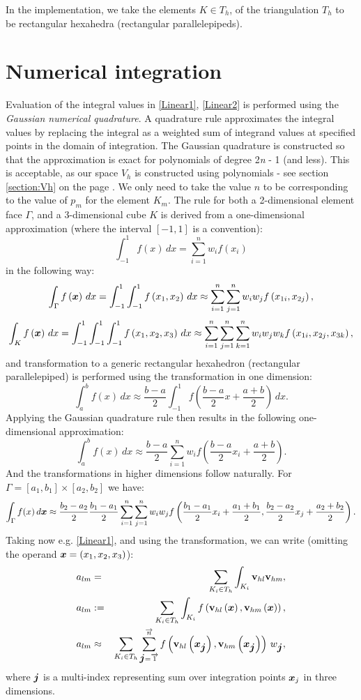 In the implementation, we take the elements $K \in T_h$, of the triangulation $T_h$ to be rectangular hexahedra (rectangular parallelepipeds).
\section{Numerical integration}
Evaluation of the integral values in \ref{Linear1}, \ref{Linear2} is performed using the \textit{Gaussian numerical quadrature}. A quadrature rule approximates the integral values by replacing the integral as a weighted sum of integrand values at specified points in the domain of integration. The Gaussian quadrature is constructed so that the approximation is exact for polynomials of degree 2\textit{n} - 1 (and less). This is acceptable, as our space $V_h$ is constructed using polynomials - see section \ref{section:Vh} on the page \pageref{section:Vh}. We only need to take the value $n$ to be corresponding to the value of $p_m$ for the element $K_m$. The rule for both a 2-dimensional element face $\Gamma$, and a 3-dimensional cube $K$ is derived from a one-dimensional approximation (where the interval $\left[-1, 1\right]$ is a convention):
$$
\int_{-1}^1 f(x)\,dx = \sum_{i=1}^n w_i f(x_i)
$$
in the following way:
$$
\int_{\Gamma} f\left(\mbox{\boldmath $x$}\right)\,dx = \int_{-1}^{1}\int_{-1}^{1} f\left( x_1, x_2\right)\,dx \approx \sum_{i=1}^n\sum_{j=1}^n w_i w_j f\left( x_{1i}, x_{2j}\right),
$$
$$
\int_{K} f\left(\mbox{\boldmath $x$}\right)\,dx = \int_{-1}^{1}\int_{-1}^{1}\int_{-1}^{1} f\left( x_1, x_2, x_3\right)\,dx \approx \sum_{i=1}^n\sum_{j=1}^n\sum_{k=1}^n w_i w_j w_k f\left( x_{1i}, x_{2j}, x_{3k}\right),
$$
and transformation to a generic rectangular hexahedron (rectangular parallelepiped) is performed using the transformation in one dimension:
$$
\int_a^b f(x)\,dx \approx \frac{b-a}{2} \int_{-1}^1 f\left(\frac{b-a}{2}x + \frac{a+b}{2}\right)\,dx.
$$
Applying the Gaussian quadrature rule then results in the following one-dimensional approximation:
$$
\int_a^b f(x)\,dx \approx \frac{b-a}{2} \sum_{i=1}^n w_i f\left(\frac{b-a}{2}x_i + \frac{a+b}{2}\right).
$$
And the transformations in higher dimensions follow naturally. For $\Gamma = \left[a_1, b_1\right] \times \left[a_2, b_2\right]$ we have:
$$
\int_{\Gamma} f(x)\,d\mbox{\boldmath $x$} \approx \frac{b_2-a_2}{2}\frac{b_1-a_1}{2} \sum_{i=1}^n \sum_{j=1}^n w_i w_j f\left(\frac{b_1-a_1}{2}x_i + \frac{a_1+b_1}{2},\frac{b_2-a_2}{2}x_j + \frac{a_2+b_2}{2}\right).
$$
Taking now e.g. \ref{Linear1}, and using the transformation, we can write (omitting the operand $\mbox{\boldmath $x$} = \left( x_1, x_2, x_3\right)$):
\begin{eqnarray}
a_{lm} & = & \sum_{K_i \in T_h}\int_{K_i} \mathrm{\mathbf{v}}_{hl} \mathrm{\mathbf{v}}_{hm}, \\
a_{lm} & := & \sum_{K_i \in T_h}\int_{K_i} f\left(\mathrm{\mathbf{v}}_{hl}\left(\mbox{\boldmath $x$}\right), \mathrm{\mathbf{v}}_{hm}\left(\mbox{\boldmath $x$}\right)\right) , \\
a_{lm} & \approx & \sum_{K_i \in T_h} \sum_{\mbox{\boldmath $j$}=\overrightarrow{1}}^{\overrightarrow{n}} f\left(\mathrm{\mathbf{v}}_{hl}\left(\mbox{\boldmath $x$}_{\mbox{\boldmath $j$}}\right), \mathrm{\mathbf{v}}_{hm}\left(\mbox{\boldmath $x$}_{\mbox{\boldmath $j$}}\right)\right)\,w_{\mbox{\boldmath $j$}},\label{Final_Integration_Fn}
\end{eqnarray}
where $\mbox{\boldmath $j$}$ is a multi-index representing sum over integration points $\mbox{\boldmath $x$}_j$ in three dimensions.

